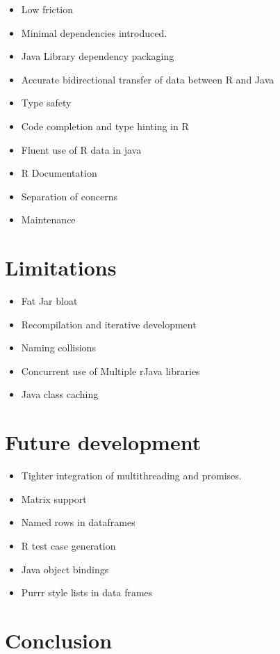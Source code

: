 \documentclass[
]{jss}
\providecommand{\tightlist}{%
  \setlength{\itemsep}{0pt}\setlength{\parskip}{0pt}}
\begin{document}
\begin{itemize}
\tightlist
\item
  Low friction
\item
  Minimal dependencies introduced.
\item
  Java Library dependency packaging
\item
  Accurate bidirectional transfer of data between R and Java
\item
  Type safety
\item
  Code completion and type hinting in R
\item
  Fluent use of R data in java
\item
  R Documentation
\item
  Separation of concerns
\item
  Maintenance
\end{itemize}

\hypertarget{limitations}{%
\section{Limitations}\label{limitations}}

\begin{itemize}
\tightlist
\item
  Fat Jar bloat
\item
  Recompilation and iterative development
\item
  Naming collisions
\item
  Concurrent use of Multiple rJava libraries
\item
  Java class caching
\end{itemize}

\hypertarget{future-development}{%
\section{Future development}\label{future-development}}

\begin{itemize}
\tightlist
\item
  Tighter integration of multithreading and promises.
\item
  Matrix support
\item
  Named rows in dataframes
\item
  R test case generation
\item
  Java object bindings
\item
  Purrr style lists in data frames
\end{itemize}

\hypertarget{conclusion}{%
\section{Conclusion}\label{conclusion}}
\end{document}
